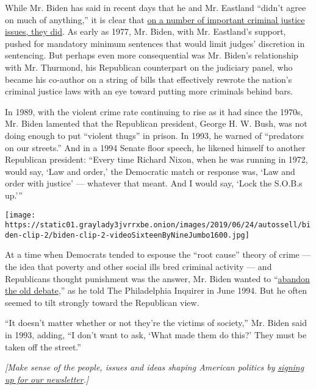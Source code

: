 While Mr. Biden has said in recent days that he and Mr. Eastland
``didn't agree on much of anything,'' it is clear that
\href{https://www.nytimes3xbfgragh.onion/2019/06/21/us/politics/joe-biden-james-eastland.html}{on
a number of important criminal justice issues, they did}. As early as
1977, Mr. Biden, with Mr. Eastland's support, pushed for mandatory
minimum sentences that would limit judges' discretion in sentencing. But
perhaps even more consequential was Mr. Biden's relationship with Mr.
Thurmond, his Republican counterpart on the judiciary panel, who became
his co-author on a string of bills that effectively rewrote the nation's
criminal justice laws with an eye toward putting more criminals behind
bars.

In 1989, with the violent crime rate continuing to rise as it had since
the 1970s, Mr. Biden lamented that the Republican president, George H.
W. Bush, was not doing enough to put ``violent thugs'' in prison. In
1993, he warned of ``predators on our streets.'' And in a 1994 Senate
floor speech, he likened himself to another Republican president:
``Every time Richard Nixon, when he was running in 1972, would say, `Law
and order,' the Democratic match or response was, `Law and order with
justice' --- whatever that meant. And I would say, `Lock the S.O.B.s
up.'''

\texttt{[image: https://static01.graylady3jvrrxbe.onion/images/2019/06/24/autossell/biden-clip-2/biden-clip-2-videoSixteenByNineJumbo1600.jpg]}

At a time when Democrats tended to espouse the ``root cause'' theory of
crime --- the idea that poverty and other social ills bred criminal
activity --- and Republicans thought punishment was the answer, Mr.
Biden wanted to
``\href{https://int.graylady3jvrrxbe.onion/data/documenthelper/1346-biden-clipping-02/7396c2788d9e76aee74b/optimized/full.pdf\#page=1}{abandon
the old debate},'' as he told The Philadelphia Inquirer in June 1994.
But he often seemed to tilt strongly toward the Republican view.

``It doesn't matter whether or not they're the victims of society,'' Mr.
Biden said in 1993, adding, ``I don't want to ask, `What made them do
this?' They must be taken off the street.''

\emph{{[}Make sense of the people, issues and ideas shaping American
politics by}
\href{https://www.nytimes3xbfgragh.onion/newsletters/politics?smid=rd?action=click\&module=Intentional\&pgtype=Article}{\emph{signing
up for our newsletter}}\emph{.{]}}

